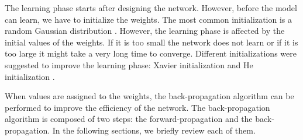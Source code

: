 The learning phase starts after designing the network. However, before the model can learn, we have to initialize the weights. The most common initialization is a random Gaussian distribution \cite{he_delving_2015}. However, the learning phase is affected by the initial values of the weights. If it is too small the network does not learn or if it is too large it might take a very long time to converge. Different initializations were suggested to improve the learning phase: Xavier initialization \cite{glorot_understanding_2010} and He initialization \cite{he_delving_2015}.

When values are assigned to the weights, the back-propagation algorithm can be performed to improve the efficiency of the network. The back-propagation algorithm is composed of two steps: the forward-propagation and the back-propagation. In the following sections, we briefly review each of them.
%

%

%
%
